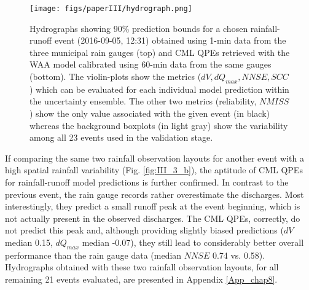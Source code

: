 \documentclass{ctuthesis}\usepackage[]{graphicx}\usepackage[]{color}
\begin{document}
\FloatBarrier



\begin{figure}[p]
\begin{center}
\texttt{[image: figs/paperIII/hydrograph.png]}
\caption{Hydrographs showing 90\% prediction bounds for a chosen rainfall-runoff event (2016-09-05, 12:31) obtained using 1-min data from the three municipal rain gauges (top) and CML QPEs retrieved with the WAA model calibrated using 60-min data from the same gauges (bottom). The violin-plots show the metrics ($dV, dQ_{max}, N\!N\!S\!E, S\!C\!C$) which can be evaluated for each individual model prediction within the uncertainty ensemble. The other two metrics (reliability, $N\!M\!I\!S\!S$) show the only value associated with the given event (in black) whereas the background boxplots (in light gray) show the variability among all 23 events used in the validation stage.} 
\label{fig:III_3} 
\end{center}
\end{figure}



If comparing the same two rainfall observation layouts for another event with a high spatial rainfall variability (Fig. \ref{fig:III_3_b}), the aptitude of CML QPEs for rainfall-runoff model predictions is further confirmed. In contrast to the previous event, the rain gauge records rather overestimate the discharges. Most interestingly, they predict a small runoff peak at the event beginning, which is not actually present in the observed discharges. The CML QPEs, correctly, do not predict this peak and, although providing slightly biased predictions ($dV$ median 0.15, $dQ_{max}$ median -0.07), they still lead to considerably better overall performance than the rain gauge data (median $N\!N\!S\!E$ 0.74 vs. 0.58). Hydrographs obtained with these two rainfall observation layouts, for all remaining 21 events evaluated, are presented in Appendix \ref{App_chap8}. 

\end{document}
